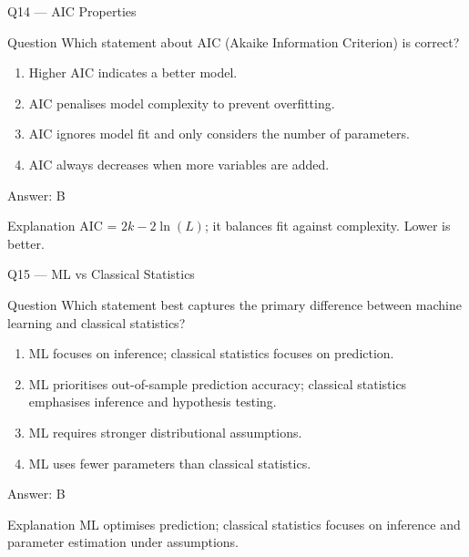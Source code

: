 \documentclass[aspectratio=169,8pt]{beamer}
\begin{document}
	\begin{frame}{Q14 --- AIC Properties}
		\begin{block}{Question}
			Which statement about AIC (Akaike Information Criterion) is correct?
		\end{block}
		\begin{enumerate}
			\item Higher AIC indicates a better model.
			\item AIC penalises model complexity to prevent overfitting.
			\item AIC ignores model fit and only considers the number of parameters.
			\item AIC always decreases when more variables are added.
		\end{enumerate}
		\begin{exampleblock}{Answer: B}\end{exampleblock}
		\begin{block}{Explanation}
			AIC = $2k - 2\ln(L)$; it balances fit against complexity. Lower is better.
		\end{block}
	\end{frame}
	
	\begin{frame}{Q15 --- ML vs Classical Statistics}
		\begin{block}{Question}
			Which statement best captures the primary difference between machine learning and classical statistics?
		\end{block}
		\begin{enumerate}
			\item ML focuses on inference; classical statistics focuses on prediction.
			\item ML prioritises out-of-sample prediction accuracy; classical statistics emphasises inference and hypothesis testing.
			\item ML requires stronger distributional assumptions.
			\item ML uses fewer parameters than classical statistics.
		\end{enumerate}
		\begin{exampleblock}{Answer: B}\end{exampleblock}
		\begin{block}{Explanation}
			ML optimises prediction; classical statistics focuses on inference and parameter estimation under assumptions.
		\end{block}
	\end{frame}
	
\end{document}
